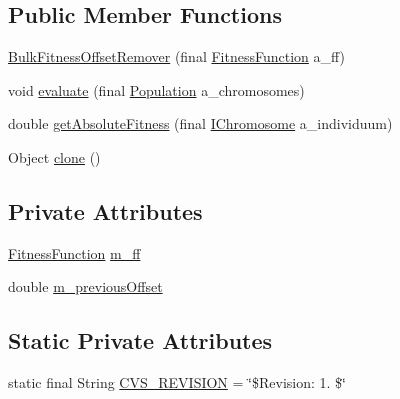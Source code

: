 \subsection*{Public Member Functions}
\begin{DoxyCompactItemize}
\item 
\hyperlink{classorg_1_1jgap_1_1impl_1_1_bulk_fitness_offset_remover_a3cb4232935702ce5db82a3e8bb378f71}{Bulk\-Fitness\-Offset\-Remover} (final \hyperlink{classorg_1_1jgap_1_1_fitness_function}{Fitness\-Function} a\-\_\-ff)
\item 
void \hyperlink{classorg_1_1jgap_1_1impl_1_1_bulk_fitness_offset_remover_a5ffd62bd47b23dfa534a5f4e775d3a0e}{evaluate} (final \hyperlink{classorg_1_1jgap_1_1_population}{Population} a\-\_\-chromosomes)
\item 
double \hyperlink{classorg_1_1jgap_1_1impl_1_1_bulk_fitness_offset_remover_ab0c11462e990be4138a99d0a6e4611e2}{get\-Absolute\-Fitness} (final \hyperlink{interfaceorg_1_1jgap_1_1_i_chromosome}{I\-Chromosome} a\-\_\-individuum)
\item 
Object \hyperlink{classorg_1_1jgap_1_1impl_1_1_bulk_fitness_offset_remover_ab7f936892509f88c709361f5356d2195}{clone} ()
\end{DoxyCompactItemize}
\subsection*{Private Attributes}
\begin{DoxyCompactItemize}
\item 
\hyperlink{classorg_1_1jgap_1_1_fitness_function}{Fitness\-Function} \hyperlink{classorg_1_1jgap_1_1impl_1_1_bulk_fitness_offset_remover_a146b2858f31e684e3bec61818a32f730}{m\-\_\-ff}
\item 
double \hyperlink{classorg_1_1jgap_1_1impl_1_1_bulk_fitness_offset_remover_a6741e29abe529b43b2e61d3301a1ce3c}{m\-\_\-previous\-Offset}
\end{DoxyCompactItemize}
\subsection*{Static Private Attributes}
\begin{DoxyCompactItemize}
\item 
static final String \hyperlink{classorg_1_1jgap_1_1impl_1_1_bulk_fitness_offset_remover_a5a306d0059b248c4b2282b633e49f878}{C\-V\-S\-\_\-\-R\-E\-V\-I\-S\-I\-O\-N} = \char`\"{}\$Revision\-: 1. \$\char`\"{}
\end{DoxyCompactItemize}
